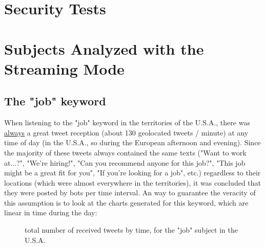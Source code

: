 \documentclass[a4paper,11pt]{report}
\begin{document}
\section{Security Tests}

\section{Subjects Analyzed with the Streaming Mode}
\subsection{The "job" keyword}
When listening to the "job" keyword in the territories of the U.S.A., there was \underline{always} a great tweet reception (about 130 geolocated tweets / minute) at any time of day (in the U.S.A., so during the European afternoon and evening). Since the majority of these tweets always contained the same texts ("Want to work at...?", "We're hiring!", "Can you recommend anyone for this job?", "This job might be a great fit for you", "If you're looking for a job", etc.) regardless to their locations (which were almost everywhere in the territories), it was concluded that they were posted by bots per time interval. An way to guarantee the veracity of this assumption is to look at the charts generated for this keyword, which are linear in time during the day:
\begin{figure}[H]
\vspace{-5pt}
\begin{center}
\vspace{-5pt}
\caption{total number of received tweets by time, for the "job" subject in the U.S.A.}
\end{center}
\end{figure}
\vspace{-10pt}
\end{document}
